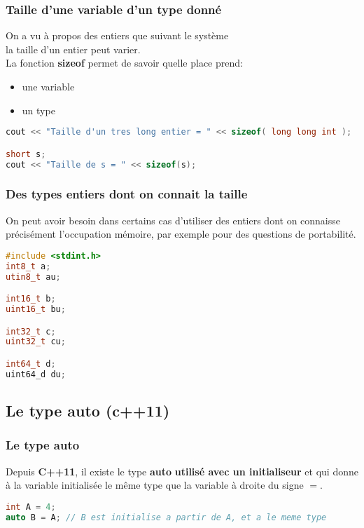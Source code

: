 \documentclass{beamer}
\begin{document}
\begin{frame}[fragile=singleslide,shrink=20]
\frametitle {Taille d'une variable d'un type donné}
On a vu à propos des entiers que suivant le système \\ la taille d'un entier peut varier. \\
La fonction \textbf{sizeof} permet de savoir quelle place prend:
\begin{itemize}
\item{une variable}
\item{un type}
\end{itemize}

\begin{lstlisting}[language=c++]
cout << "Taille d'un tres long entier = " << sizeof( long long int );

short s;
cout << "Taille de s = " << sizeof(s);
\end{lstlisting}
\end{frame}

\begin{frame}[fragile=singleslide,shrink=20]
\frametitle {Des types entiers dont on connait la taille}
On peut avoir besoin dans certains cas d'utiliser des entiers dont on connaisse \\
précisément l'occupation mémoire, par exemple pour des questions de portabilité.
\begin{lstlisting}[language=c++]
#include <stdint.h>
int8_t a;
utin8_t au;

int16_t b;
uint16_t bu;

int32_t c;
uint32_t cu;

int64_t d;
uint64_d du;
\end{lstlisting}
\end{frame}

\subsection{Le type auto (c++11)}

\begin{frame}[fragile=singleslide,shrink=20]
\frametitle{Le type auto}

Depuis \textbf{C++11}, il existe le type \textbf{auto} \textbf{utilisé avec un initialiseur} et qui donne à la variable initialisée le même type que la variable à droite du signe $=$.

\begin{lstlisting}[language=c++]
int A = 4;
auto B = A; // B est initialise a partir de A, et a le meme type
\end{lstlisting}
\end{frame}
\end{document}
